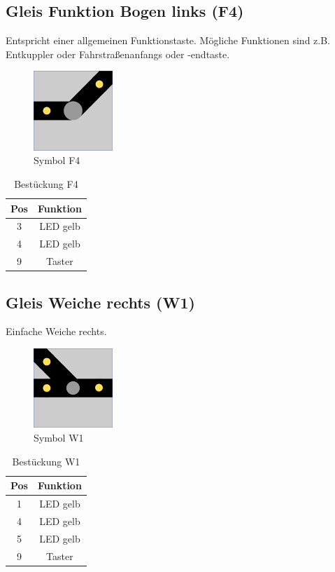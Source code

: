 \documentclass[10pt,a4paper]{article}
\begin{document}
\subsection{Gleis Funktion Bogen links (F4)}
Entspricht einer allgemeinen Funktionstaste. Mögliche Funktionen sind z.B. Entkuppler oder Fahrstraßenanfangs oder -endtaste.
\begin{figure}[hbtp]
\centering
\includegraphics[width=3cm]{../folien/f4.png}
\caption{Symbol F4}
\end{figure}
\begin{table}[h!]
\centering
\begin{tabular}{c|c}
\textbf{Pos} & \textbf{Funktion} \\ \hline
3 & LED gelb \\
4 & LED gelb \\
9 & Taster
\end{tabular}
\caption{Bestückung F4}
\end{table}

\newpage
\subsection{Gleis Weiche rechts (W1)}
Einfache Weiche rechts.
\begin{figure}[hbtp]
\centering
\includegraphics[width=3cm]{../folien/w1.png}
\caption{Symbol W1}
\end{figure}
\begin{table}[h!]
\centering
\begin{tabular}{c|c}
\textbf{Pos} & \textbf{Funktion} \\ \hline
1 & LED gelb \\
4 & LED gelb \\
5 & LED gelb \\
9 & Taster
\end{tabular}
\caption{Bestückung W1}
\end{table}
\end{document}
